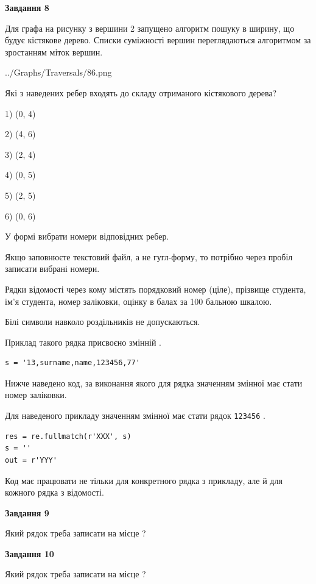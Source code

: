 \documentclass[12pt, ukrainian]{article}
\def\code#1{\Verb!#1!}
\begin{document}
{\begin {large}
{\begin {center}\textbf{Завдання 8}\end {center}}\par
Для графа на рисунку з вершини 2 запущено алгоритм пошуку в ширину, що будує кістякове дерево. Списки суміжності вершин переглядаються алгоритмом за зростанням міток вершин.\par
\begin{center}
	{../Graphs/Traversals/86.png}
\end{center}
\par Які з наведених ребер входять до складу отриманого кістякового дерева?\par
1) (0, 4)\par
2) (4, 6)\par
3) (2, 4)\par
4) (0, 5)\par
5) (2, 5)\par
6) (0, 6)\par
{\vskip 15pt} У формі вибрати номери відповідних ребер.


Якщо заповнюєте текстовий файл, а не гугл-форму, то потрібно через пробіл записа\-ти вибрані номери.\par
\newpage


Рядки відомості через кому містять порядковий номер (ціле), пріз\-ви\-ще студен\-та, ім'я студента, номер заліковки, оцінку в балах за 100 бальною шкалою.

Білі символи навколо роздільників не допускаються.

Приклад такого рядка присвоєно змінній .



\begin{verbatim}
s = '13,surname,name,123456,77'
\end{verbatim}


Нижче наведено код, за виконання якого для рядка  значенням змінної  має стати номер заліковки.

Для наведеного прикладу значенням змінної  має стати рядок \code{123456} .



\begin{verbatim}
res = re.fullmatch(r'XXX', s)
s = ''
out = r'YYY'
\end{verbatim}


Код має працювати не тільки для конкретного рядка з прикладу, але й для кожного рядка з відомості.

{\begin {center}\textbf{Завдання 9}\end {center}}\par
Який рядок треба записати на місце  ?\par
\vspace{5mm}


{\begin {center}\textbf{Завдання 10}\end {center}}\par
Який рядок треба записати на місце  ?\par


\newpage


\end {large}}
\end{document}
